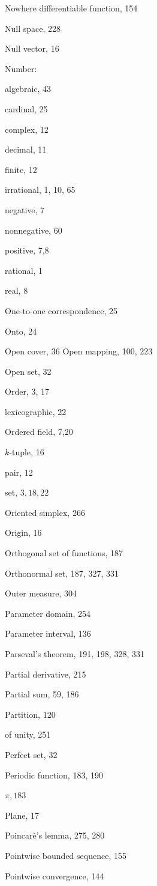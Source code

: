\documentclass[10pt]{article}
\begin{document}
Nowhere differentiable function, 154

Null space, 228

Null vector, 16

Number:

algebraic, 43

cardinal, 25

complex, 12

decimal, 11

finite, 12

irrational, 1, 10, 65

negative, 7

nonnegative, 60

positive, 7,8

rational, 1

real, 8

One-to-one correspondence, 25

Onto, 24

Open cover, 36
Open mapping, 100, 223

Open set, 32

Order, 3, 17

lexicographic, 22

Ordered field, 7,20

$k$-tuple, 16

pair, 12

set, $3,18,22$

Oriented simplex, 266

Origin, 16

Orthogonal set of functions, 187

Orthonormal set, 187, 327, 331

Outer measure, 304

Parameter domain, 254

Parameter interval, 136

Parseval's theorem, 191, 198, 328, 331

Partial derivative, 215

Partial sum, 59, 186

Partition, 120

of unity, 251

Perfect set, 32

Periodic function, 183, 190

$\pi, 183$

Plane, 17

Poincarè's lemma, 275, 280

Pointwise bounded sequence, 155

Pointwise convergence, 144
\end{document}
